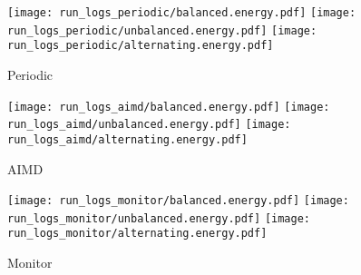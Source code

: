 \documentclass{article}
\begin{document}
\begin{landscape}
\begin{figure}
\centering

\texttt{[image: run\_logs\_periodic/balanced.energy.pdf]}
\texttt{[image: run\_logs\_periodic/unbalanced.energy.pdf]}
\texttt{[image: run\_logs\_periodic/alternating.energy.pdf]}
\vspace{-.5cm}
\caption{Periodic}

\texttt{[image: run\_logs\_aimd/balanced.energy.pdf]}
\texttt{[image: run\_logs\_aimd/unbalanced.energy.pdf]}
\texttt{[image: run\_logs\_aimd/alternating.energy.pdf]}
\vspace{-.5cm}
\caption{AIMD}

\texttt{[image: run\_logs\_monitor/balanced.energy.pdf]}
\texttt{[image: run\_logs\_monitor/unbalanced.energy.pdf]}
\texttt{[image: run\_logs\_monitor/alternating.energy.pdf]}
\vspace{-.5cm}
\caption{Monitor}

\end{figure}
\end{landscape}
\end{document}

